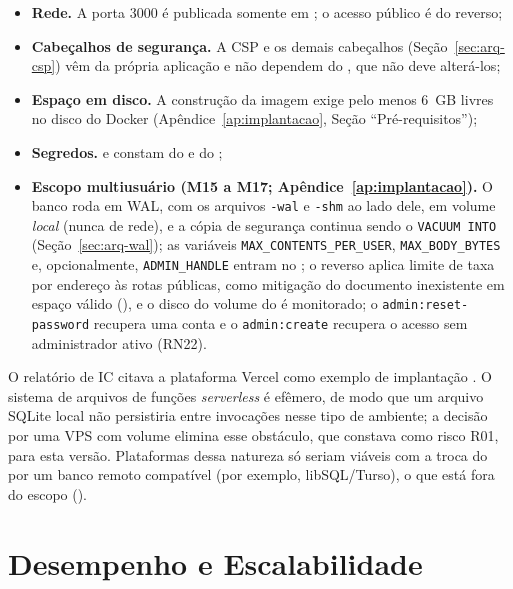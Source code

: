 \begin{itemize}
  \item \textbf{Rede.} A porta 3000 é publicada somente em ; o acesso público é do  reverso;
  \item \textbf{Cabeçalhos de segurança.} A CSP e os demais cabeçalhos (Seção~\ref{sec:arq-csp}) vêm da própria aplicação e não dependem do , que não deve alterá-los;
  \item \textbf{Espaço em disco.} A construção da imagem exige pelo menos 6~GB livres no disco do Docker (Apêndice~\ref{ap:implantacao}, Seção ``Pré-requisitos'');
  \item \textbf{Segredos.}  e  constam do  e do ;
  \item \textbf{Escopo multiusuário (M15 a M17; Apêndice~\ref{ap:implantacao}).} O banco roda em WAL, com os arquivos \texttt{-wal} e \texttt{-shm} ao lado dele, em volume \emph{local} (nunca de rede), e a cópia de segurança continua sendo o \texttt{VACUUM INTO} (Seção~\ref{sec:arq-wal}); as variáveis \texttt{MAX\_CONTENTS\_PER\_USER}, \texttt{MAX\_BODY\_BYTES} e, opcionalmente, \texttt{ADMIN\_HANDLE} entram no ; o  reverso aplica limite de taxa por endereço às rotas públicas, como mitigação do documento inexistente em espaço válido (), e o disco do volume do  é monitorado; o \texttt{admin:reset-password} recupera uma conta e o \texttt{admin:create} recupera o acesso sem administrador ativo (RN22).
\end{itemize}

O relatório de IC citava a plataforma Vercel como exemplo de implantação \cite{reis2026ic}. O sistema de arquivos de funções \emph{serverless} é efêmero, de modo que um arquivo SQLite local não persistiria entre invocações nesse tipo de ambiente; a decisão por uma VPS com volume elimina esse obstáculo, que constava como risco R01, para esta versão. Plataformas dessa natureza só seriam viáveis com a troca do  por um banco remoto compatível (por exemplo, libSQL/Turso), o que está fora do escopo ().

\section{Desempenho e Escalabilidade}\label{sec:arq-desempenho}

